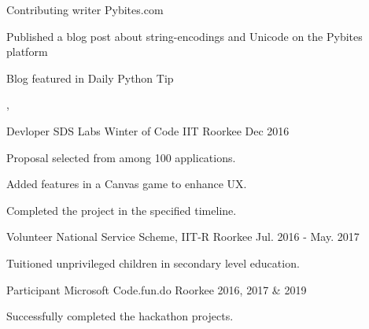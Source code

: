 

\begin{cventries}

  \cventry
    {Contributing writer} %
    {Pybites.com} %
    {} %
    {} %
    { \begin{cvitems} %
        \item {Published a blog post about string-encodings and Unicode on the Pybites platform}
        \item {Blog featured in Daily Python Tip}
      \end{cvitems}
    , 
   }

  \cventry
    {Devloper} %
    {SDS Labs Winter of Code} %
    {IIT Roorkee} %
    {Dec 2016} %
    {
    \begin{cvitems} %
        \item {Proposal selected from among 100 applications.}
        \item {Added features in a Canvas game to enhance UX.}
        \item {Completed the project in the specified timeline.}
      \end{cvitems}
    }


  \cventry
    {Volunteer} %
    {National Service Scheme, IIT-R} %
    {Roorkee} %
    {Jul. 2016 - May. 2017} %
    {
    \begin{cvitems} %
        \item {Tuitioned unprivileged children in secondary level education.}
      \end{cvitems}}


  \cventry
    {Participant} %
    {Microsoft Code.fun.do} %
    {Roorkee} %
    {2016, 2017 \& 2019} %
    {    \begin{cvitems} %
        \item {Successfully completed the hackathon projects.}
      \end{cvitems}}

\end{cventries}
